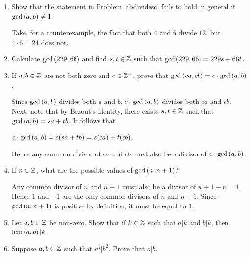 \documentclass[11pt,fleqn,dvipsnames,usenames]{article}
\newcommand{\p}{\noindent}
\begin{document}
\begin{enumerate}
\item Show that the statement in Problem \ref{abdividesc} fails to hold in general if $\text{gcd}\left(a,b\right)\neq 1$.
\vsmsp

\solution Take, for a counterexample, the fact that both $4$ and $6$ divide $12$, but $4\cdot 6 = 24$ does not.

\item Calculate $\text{gcd}\left(229,66\right)$ and find $s,t\in\mathbb{Z}$ such that $\text{gcd}\left(229,66\right) = 229s + 66t$.
\item If $a,b\in\mathbb{Z}$ are not both zero and $c\in\mathbb{Z}^{+}$, prove that $\text{gcd}\left(ca,cb\right) = c\cdot \text{gcd}\left(a,b\right)$.
\vsmsp

\solution Since $\text{gcd}\left(a,b\right)$ divides both $a$ and $b$, $c\cdot \text{gcd}\left(a,b\right)$ divides both $ca$ and $cb$.
Next, note that by Bezout's identity, there exists $s,t\in\mathbb{Z}$ such that $\text{gcd}\left(a,b\right) = sa + tb$.  It follows that
\begin{center}
$c\cdot \text{gcd}\left(a,b\right) = c(sa + tb) = s(ca) + t(cb)$.
\end{center}
Hence any common divisor of $ca$ and $cb$ must also be a divisor of $c\cdot\text{gcd}\left(a,b\right)$.

\item If $n\in \mathbb{Z}$, what are the possible values of $\text{gcd}\left(n, n+1\right)$?
\vsmsp

\solution Any common divisor of $n$ and $n+1$ must also be a divisor of $n+1 - n = 1$.  Hence $1$ and $-1$ are the only common divisors of $n$ and $n+1$.  Since $\text{gcd}\left(n,n+1\right)$ is positive by definition, it must be equal to $1$.

\item Let $a,b\in\mathbb{Z}$ be non-zero.  Show that if $k\in\mathbb{Z}$ such that $a|k$ and $b|k$, then $\text{lcm}\left(a, b\right)|k$.


\item Suppose $a,b\in\mathbb{Z}$ such that $a^2|b^2$.  Prove that $a|b$.
\vsmsp


\end{enumerate}
\end{document}
